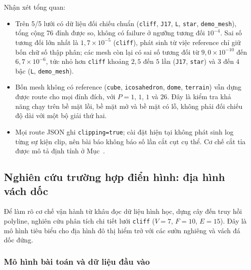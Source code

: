Nhận xét tổng quan:
\begin{itemize}
  \item Trên 5/5 lưới có dữ liệu đối chiếu chuẩn (\texttt{cliff}, \texttt{J17},
    \texttt{L}, \texttt{star}, \texttt{demo\_mesh}), tổng cộng 76 đỉnh được so,
    không có failure ở ngưỡng tương đối $10^{-4}$. Sai số tương đối lớn nhất là
    $1{,}7\times10^{-5}$ (\texttt{cliff}), phát sinh từ việc reference chỉ giữ
    bốn chữ số thập phân; các mesh còn lại có sai số tương đối từ
    $9{,}0\times10^{-10}$ đến $6{,}7\times10^{-6}$, tức nhỏ hơn \texttt{cliff}
    khoảng $2{,}5$ đến $5$ lần (\texttt{J17}, \texttt{star}) và $3$ đến $4$ bậc
    (\texttt{L}, \texttt{demo\_mesh}).
  \item Bốn mesh không có reference (\texttt{cube}, \texttt{icosahedron},
    \texttt{dome}, \texttt{terrain}) vẫn dựng được route cho mọi đỉnh đích, với
    $P=1$, $1$, $1$ và $26$. Đây là kiểm tra khả năng chạy trên bề mặt lồi, bề mặt
    mở và bề mặt có lỗ, không phải đối chiếu độ dài với một bộ giải thứ hai.
  \item Mọi route JSON ghi \texttt{clipping=true}; cài đặt hiện tại không phát
    sinh log từng sự kiện clip, nên bài báo không báo số lần cắt cụt cụ thể. Cơ
    chế cắt tỉa được mô tả định tính ở Mục~.
\end{itemize}

\begin{code}[!t]
  
  \caption{Trích kết quả đối chiếu của \texttt{cliff}: thông tin mesh,
    nguồn, dung sai, sai số tương đối và danh sách độ dài từng đỉnh. Trường
    \texttt{paths} là nguồn của Bảng~\ref{tab:ket-qua-tong-the} và
    Bảng~\ref{tab:cliff-output}.}
  \label{code:compare}
\end{code}

\subsection{Nghiên cứu trường hợp điển hình: địa hình vách dốc}

Để làm rõ cơ chế vận hành từ khâu đọc dữ liệu hình học, dựng cây đến truy hồi
polyline, nghiên cứu phân tích chi tiết lưới \texttt{cliff} ($V=7$, $F=10$,
$E=15$). Đây là mô hình tiêu biểu cho địa hình đô thị hiểm trở với các sườn nghiêng
và vách đá dốc đứng.

\subsubsection{Mô hình bài toán và dữ liệu đầu vào}

